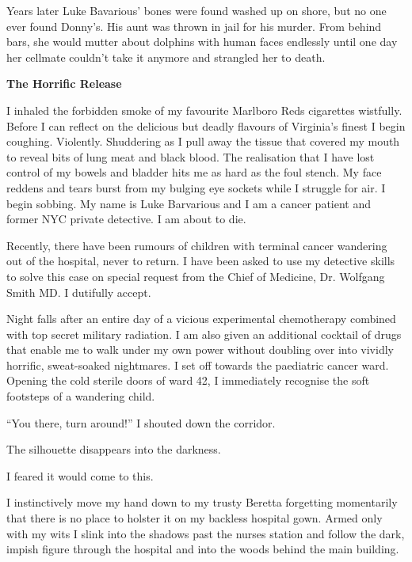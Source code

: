Years later Luke Bavarious' bones were found washed up on shore,
but no one ever found Donny's. His aunt was thrown in jail for his
murder. From behind bars, she would mutter about dolphins with
human faces endlessly until one day her cellmate couldn't take it
anymore and strangled her to death. 
 





{\bf The Horrific Release}



I inhaled the forbidden smoke of my favourite Marlboro Reds
cigarettes wistfully. Before I can reflect on the delicious but
deadly flavours of Virginia's finest I begin coughing. Violently.
Shuddering as I pull away the tissue that covered my mouth to
reveal bits of lung meat and black blood. The realisation that I
have lost control of my bowels and bladder hits me as hard as the
foul stench. My face reddens and tears burst from my bulging eye
sockets while I struggle for air. I begin sobbing. My name is Luke
Barvarious and I am a cancer patient and former NYC private
detective. I am about to die.

Recently, there have been rumours of children with terminal cancer
wandering out of the hospital, never to return. I have been asked
to use my detective skills to solve this case on special request
from the Chief of Medicine, Dr. Wolfgang Smith MD. I dutifully
accept.

Night falls after an entire day of a vicious experimental
chemotherapy combined with top secret military radiation. I am also
given an additional cocktail of drugs that enable me to walk under
my own power without doubling over into vividly horrific,
sweat-soaked nightmares. I set off towards the paediatric cancer
ward. Opening the cold sterile doors of ward 42, I immediately
recognise the soft footsteps of a wandering child.

``You there, turn around!'' I shouted down the corridor.

The silhouette disappears into the darkness.

I feared it would come to this.

I instinctively move my hand down to my trusty Beretta forgetting
momentarily that there is no place to holster it on my backless
hospital gown. Armed only with my wits I slink into the shadows
past the nurses station and follow the dark, impish figure through
the hospital and into the woods behind the main building.

